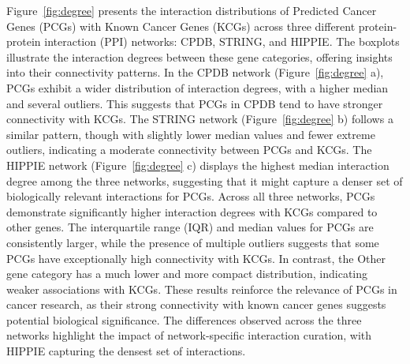 Figure~\ref{fig:degree} presents the interaction distributions of Predicted Cancer Genes (PCGs) with Known Cancer Genes (KCGs) across three different protein-protein interaction (PPI) networks: CPDB, STRING, and HIPPIE. The boxplots illustrate the interaction degrees between these gene categories, offering insights into their connectivity patterns.
In the CPDB network (Figure~\ref{fig:degree} a), PCGs exhibit a wider distribution of interaction degrees, with a higher median and several outliers. This suggests that PCGs in CPDB tend to have stronger connectivity with KCGs. The STRING network (Figure~\ref{fig:degree} b) follows a similar pattern, though with slightly lower median values and fewer extreme outliers, indicating a moderate connectivity between PCGs and KCGs. The HIPPIE network (Figure~\ref{fig:degree} c) displays the highest median interaction degree among the three networks, suggesting that it might capture a denser set of biologically relevant interactions for PCGs.
Across all three networks, PCGs demonstrate significantly higher interaction degrees with KCGs compared to other genes. The interquartile range (IQR) and median values for PCGs are consistently larger, while the presence of multiple outliers suggests that some PCGs have exceptionally high connectivity with KCGs. In contrast, the Other gene category has a much lower and more compact distribution, indicating weaker associations with KCGs.
These results reinforce the relevance of PCGs in cancer research, as their strong connectivity with known cancer genes suggests potential biological significance. The differences observed across the three networks highlight the impact of network-specific interaction curation, with HIPPIE capturing the densest set of interactions. 

